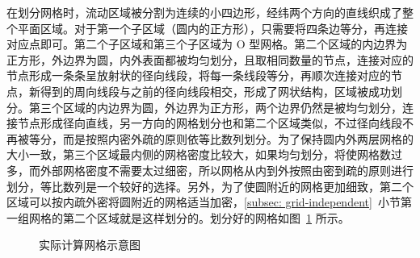 在划分网格时，流动区域被分割为连续的小四边形，经纬两个方向的直线织成了整个平面区域。对于第一个子区域（圆内的正方形），只需要将四条边等分，再连接对应点即可。第二个子区域和第三个子区域为 O 型网格。第二个区域的内边界为正方形，外边界为圆，内外表面都被均匀划分，且取相同数量的节点，连接对应的节点形成一条条呈放射状的径向线段，将每一条线段等分，再顺次连接对应的节点，新得到的周向线段与之前的径向线段相交，形成了网状结构，区域被成功划分。第三个区域的内边界为圆，外边界为正方形，两个边界仍然是被均匀划分，连接节点形成径向直线，另一方向的网格划分也和第二个区域类似，不过径向线段不再被等分，而是按照内密外疏的原则依等比数列划分。为了保持圆内外两层网格的大小一致，第三个区域最内侧的网格密度比较大，如果均匀划分，将使网格数过多，而外部网格密度不需要太过细密，所以网格从内到外按照由密到疏的原则进行划分，等比数列是一个较好的选择。另外，为了使圆附近的网格更加细致，第二个区域可以按内疏外密将圆附近的网格适当加密，\ref{subsec: grid-independent}~小节第一组网格的第二个区域就是这样划分的。划分好的网格如图~\ref{fig: sketch of grid} 所示。

\begin{figure}
	\centering
	\vspace{0.2em}
	\caption{实际计算网格示意图}\label{fig: sketch of grid}
\end{figure}

